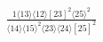 \documentclass[varwidth, border=5pt]{standalone}
\begin{document}
\begin{my}
$\begin{gathered}
\scriptscriptstyle\frac{1⟨13⟩⟨12⟩[23]^2⟨25⟩^2}{⟨14⟩⟨15⟩^2⟨23⟩⟨24⟩[25]^2}
\end{gathered}$
\end{my}
\end{document}
